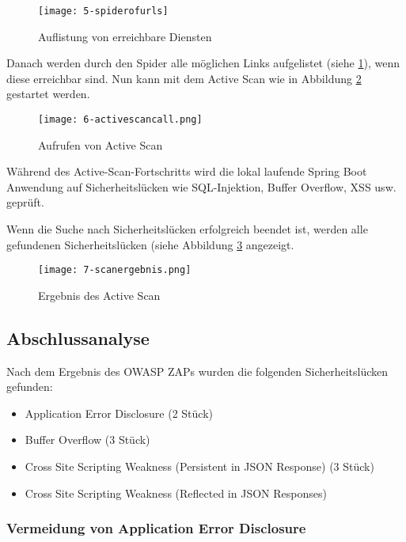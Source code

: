 \begin{figure}[h]
	\centering
	\texttt{[image: 5-spiderofurls]}
	\caption{Auflistung von erreichbare Diensten}
	\label{swaggerimport3}
\end{figure}

Danach werden durch den Spider alle möglichen Links aufgelistet (siehe \ref{swaggerimport3}), wenn diese erreichbar sind. Nun kann mit dem Active Scan wie in Abbildung \ref{swaggerimport4} gestartet werden. 

\begin{figure}[h]
	\centering
	\texttt{[image: 6-activescancall.png]}
	\caption{Aufrufen von Active Scan}
	\label{swaggerimport4}
\end{figure}

Während des Active-Scan-Fortschritts wird die lokal laufende Spring Boot Anwendung auf Sicherheitslücken wie SQL-Injektion, Buffer Overflow, XSS usw. geprüft.

\newpage

Wenn die Suche nach Sicherheitslücken erfolgreich beendet ist, werden alle gefundenen Sicherheitslücken (siehe Abbildung \ref{swaggerimport5} angezeigt.

\begin{figure}[h]
	\centering
	\texttt{[image: 7-scanergebnis.png]}
	\caption{Ergebnis des Active Scan}
	\label{swaggerimport5}
\end{figure}

\subsection{Abschlussanalyse}

Nach dem Ergebnis des OWASP ZAPs wurden die folgenden Sicherheitslücken gefunden:

\begin{itemize}
	\item Application Error Disclosure (2 Stück)
	\item Buffer Overflow (3 Stück)
	\item Cross Site Scripting Weakness (Persistent in JSON Response) (3 Stück)
	\item Cross Site Scripting Weakness (Reflected in JSON Responses)
\end{itemize}

\subsubsection{Vermeidung von Application Error Disclosure}

